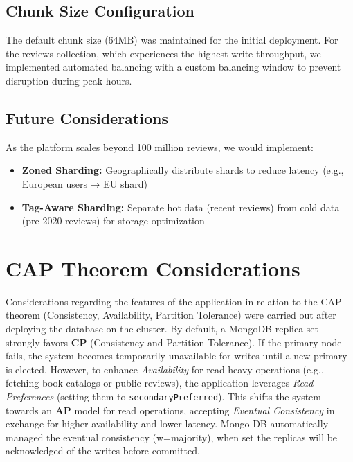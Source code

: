 \subsection{Chunk Size Configuration}
The default chunk size (64MB) was maintained for the initial deployment. For the reviews collection, which experiences the highest write throughput, we implemented automated balancing with a custom balancing window to prevent disruption during peak hours.

\subsection{Future Considerations}
As the platform scales beyond 100 million reviews, we would implement:
\begin{itemize}
    \item \textbf{Zoned Sharding:} Geographically distribute shards to reduce latency (e.g., European users → EU shard)
    \item \textbf{Tag-Aware Sharding:} Separate hot data (recent reviews) from cold data (pre-2020 reviews) for storage optimization
\end{itemize}

\section{CAP Theorem Considerations}
Considerations regarding the features of the application in relation to the CAP theorem (Consistency, Availability, Partition Tolerance) were carried out after deploying the database on the cluster.
By default, a MongoDB replica set strongly favors \textbf{CP} (Consistency and Partition Tolerance). If the primary node fails, the system becomes temporarily unavailable for writes until a new primary is elected. However, to enhance \textit{Availability} for read-heavy operations (e.g., fetching book catalogs or public reviews), the application leverages \textit{Read Preferences} (setting them to \texttt{secondaryPreferred}). This shifts the system towards an \textbf{AP} model for read operations, accepting \textit{Eventual Consistency} in exchange for higher availability and lower latency.
Mongo DB automatically managed the eventual consistency (w=majority), when set the replicas will be acknowledged of the writes before committed. 


